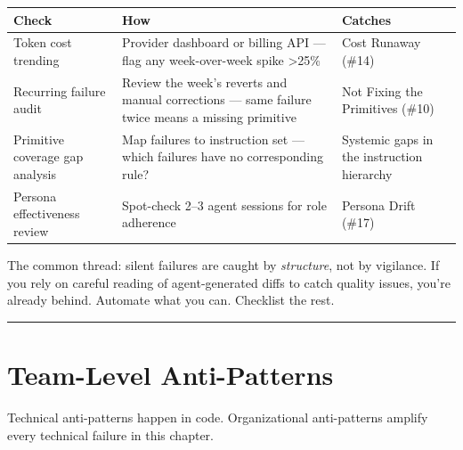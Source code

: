 \documentclass[
  a4paper,
  DIV=11,
  numbers=noendperiod]{scrreprt}
\newcounter{none} %
\begin{document}
{\def\LTcaptype{none} %
\begin{longtable}[]{@{}
  >{\raggedright\arraybackslash}p{}
  >{\raggedright\arraybackslash}p{}
  >{\raggedright\arraybackslash}p{}@{}}
\toprule\noalign{}
\begin{minipage}[b]{\linewidth}\raggedright
Check
\end{minipage} & \begin{minipage}[b]{\linewidth}\raggedright
How
\end{minipage} & \begin{minipage}[b]{\linewidth}\raggedright
Catches
\end{minipage} \\
\midrule\noalign{}
\endhead
\bottomrule\noalign{}
\endlastfoot
Token cost trending & Provider dashboard or billing API --- flag any
week-over-week spike \textgreater25\% & Cost Runaway (\#14) \\
Recurring failure audit & Review the week's reverts and manual
corrections --- same failure twice means a missing primitive & Not
Fixing the Primitives (\#10) \\
Primitive coverage gap analysis & Map failures to instruction set ---
which failures have no corresponding rule? & Systemic gaps in the
instruction hierarchy \\
Persona effectiveness review & Spot-check 2--3 agent sessions for role
adherence & Persona Drift (\#17) \\
\end{longtable}
}

The common thread: silent failures are caught by \emph{structure}, not
by vigilance. If you rely on careful reading of agent-generated diffs to
catch quality issues, you're already behind. Automate what you can.
Checklist the rest.

\begin{center}\rule{0.5\linewidth}{0.5pt}\end{center}

\section{Team-Level Anti-Patterns}\label{team-level-anti-patterns}

Technical anti-patterns happen in code. Organizational anti-patterns
amplify every technical failure in this chapter.
\end{document}
